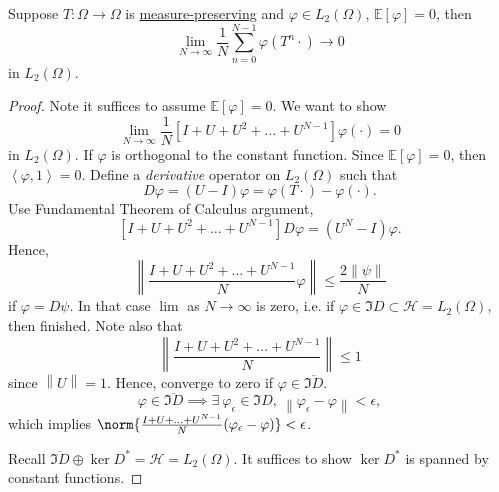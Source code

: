 \begin{proposition}
	Suppose \(T\colon \Omega \to \Omega\) is \hyperref[def:measure-preserving]{measure-preserving} and \(\varphi \in L_2(\Omega)\), \(\mathbb{E}\left[\varphi \right] = 0\), then
	\[
		\lim\limits_{N \to \infty} \frac{1}{N} \sum_{n = 0}^{N - 1} \varphi(T^n \cdot) \to 0
	\]
	in \(L_2(\Omega)\).
\end{proposition}
\begin{proof}
	Note it suffices to assume \(\mathbb{E}\left[\varphi \right] = 0\). We want to show
	\[
		\lim_{N \to \infty} \frac{1}{N} [I + U + U^2 + \ldots + U^{N-1}] \varphi(\cdot) = 0
	\]
	in \(L_2(\Omega)\). If \(\varphi\) is orthogonal to the constant function. Since \(\mathbb{E}\left[\varphi \right] = 0\), then \(\left\langle \varphi, 1 \right\rangle  = 0\). Define a \emph{derivative} operator on \(L_2(\Omega)\) such that
	\[
		D \varphi = (U - I) \varphi = \varphi(T \cdot) - \varphi(\cdot).
	\]
	Use Fundamental Theorem of Calculus argument,
	\[
		[I + U + U^2 + \ldots + U^{N-1}] D\varphi = (U^N - I) \varphi.
	\]
	Hence,
	\[
		\left\lVert \frac{I + U + U^2 + \ldots + U^{N-1}}{N} \varphi\right\rVert \leq \frac{2 \left\lVert \psi\right\rVert }{N}
	\]
	if \(\varphi = D \psi\). In that case \(\lim\) as \(N \to \infty\) is zero, i.e. if \(\varphi \in \Im{D} \subset \mathcal{H} = L_2(\Omega)\), then finished. Note also that
	\[
		\left\lVert \frac{I + U + U^2 + \ldots + U^{N-1}}{N}\right\rVert \leq 1
	\]
	since \(\left\lVert U\right\rVert = 1\). Hence, converge to zero if \(\varphi \in \overline{\Im{D}}\).
	\[
		\varphi \in \overline{\Im{D}} \implies \exists\ \varphi_\epsilon \in \Im{D},\ \left\lVert \varphi_\epsilon - \varphi\right\rVert  < \epsilon,
	\]
	which implies \(\norm{\frac{I + U + \ldots + U^{N-1}}{N} (\varphi_\epsilon - \varphi)} < \epsilon\).

	Recall \(\overline{\Im{D}} \oplus \ker{D^{\ast}} = \mathcal{H} = L_2(\Omega)\). It suffices to show \(\ker{D^{\ast}}\) is spanned by constant functions.


\end{proof}
